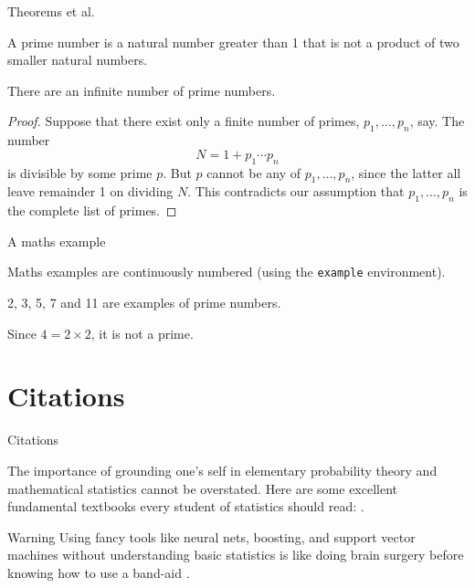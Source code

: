 \documentclass[]{beamer}
\begin{document}
\begin{frame}{Theorems et al.}

	\begin{definition}
		A prime number is a natural number greater than 1 that is not a product of two smaller natural numbers.
	\end{definition}
	
	\begin{theorem}
		There are an infinite number of prime numbers.
	\end{theorem}
	
	\begin{proof}
		Suppose that there exist only a finite number of primes, $p_1,\dots,p_n$, say.
		The number 
		\[
		  N = 1+p_1\cdots p_n
		\]
		is divisible by some prime $p$.
		But $p$ cannot be any of $p_1,\dots,p_n$, since the latter all leave remainder 1 on dividing $N$.
		This contradicts our assumption that $p_1,\dots,p_n$ is the complete list of primes.
	\end{proof}

\end{frame}

\begin{frame}{A maths example}

	Maths examples are continuously numbered (using the \texttt{example} environment).
	
	\begin{example}
		2, 3, 5, 7 and 11 are examples of prime numbers.
	\end{example}

	\begin{example}
		Since $4 = 2 \times 2$, it is not a prime.
	\end{example}

\end{frame}

\section{Citations}

\begin{frame}{Citations}

	
	The importance of grounding one's self in elementary probability theory and mathematical statistics cannot be overstated.
	Here are some excellent fundamental textbooks every student of statistics should read: \citet{casella2002statistical,	pawitan2001all, wasserman2013all}.
	
	\begin{alertblock}{Warning}
		Using fancy tools like neural nets, boosting, and support vector machines without understanding basic statistics is like doing brain surgery before knowing how to use a band-aid \citep{wasserman2013all}.
	\end{alertblock}

\end{frame}
\end{document}
